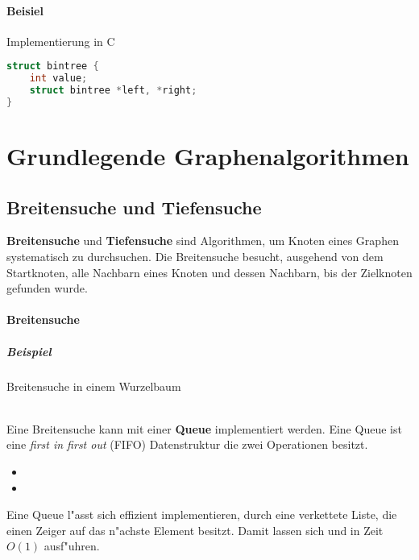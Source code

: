 \paragraph{Beisiel} Implementierung in C
\begin{lstlisting}[language=C]
struct bintree {
    int value;
    struct bintree *left, *right;
}
\end{lstlisting}

\section{Grundlegende Graphenalgorithmen}
\subsection{Breitensuche und Tiefensuche}

\textbf{Breitensuche} und \textbf{Tiefensuche} sind Algorithmen, um Knoten eines Graphen systematisch zu
durchsuchen. Die Breitensuche besucht, ausgehend von dem Startknoten, alle Nachbarn eines Knoten und dessen
Nachbarn, bis der Zielknoten gefunden wurde.

\paragraph{Breitensuche}
\subparagraph{Beispiel} Breitensuche in einem Wurzelbaum\\
\\
Eine Breitensuche kann mit einer \textbf{Queue} implementiert werden. Eine Queue ist eine
\textit{first in first out} (FIFO) Datenstruktur die zwei Operationen besitzt.
\begin{itemize}
    \item {}
    \item {}
\end{itemize}
Eine Queue l"asst sich effizient implementieren, durch eine verkettete Liste, die einen Zeiger auf das n"achste
Element besitzt. Damit lassen sich  und  in Zeit $O(1)$ ausf"uhren.

